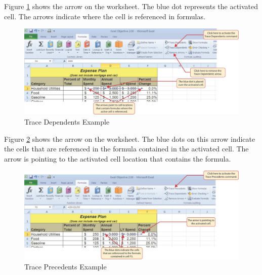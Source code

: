 Figure \ref{02:fig09} shows the  arrow on the  worksheet. The blue dot represents the activated cell. The arrows indicate where the cell is referenced in formulas.

\begin{figure}[H]
	\centering
	\includegraphics[width=\maxwidth{.95\linewidth}]{gfx/ch02_fig09}
	\caption{Trace Dependents Example}
	\label{02:fig09}
\end{figure}

Figure \ref{02:fig10} shows the  arrow on the  worksheet. The blue dots on this arrow indicate the cells that are referenced in the formula contained in the activated cell. The arrow is pointing to the activated cell location that contains the formula.

\begin{figure}[H]
	\centering
	\includegraphics[width=\maxwidth{.95\linewidth}]{gfx/ch02_fig10}
	\caption{Trace Precedents Example}
	\label{02:fig10}
\end{figure}

